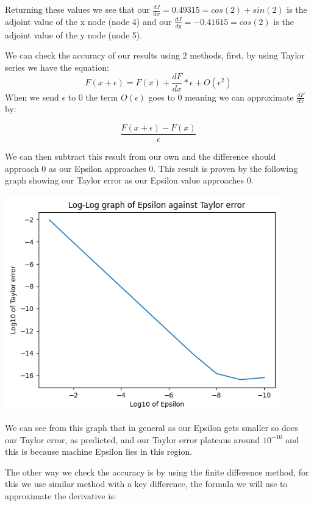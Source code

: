 \documentclass{article}
\begin{document}
Returning these values we see that our $\frac{dJ}{dx} = 0.49315 = cos(2) + sin(2)$ is the adjoint value of the x node (node 4) and our $\frac{dJ}{dy} = -0.41615 = cos(2)$ is the adjoint value of the y node (node 5).

We can check the accuracy of our results using 2 methods, first, by using Taylor series we have the equation:
\begin{equation}
    F(x + \epsilon) = F(x) + \frac{dF}{dx} * \epsilon + O(\epsilon ^ 2)
\end{equation}
When we send $\epsilon$ to 0 the term $O(\epsilon)$ goes to 0 meaning we can approximate $\frac{dF}{dx}$ by:

\begin{equation}
    \frac{F(x + \epsilon) - F(x)}{\epsilon}
\end{equation}

We can then subtract this result from our own and the difference should approach 0 as our Epsilon approaches 0. This result is proven by the following graph showing our Taylor error as our Epsilon value approaches 0.

\begin{center}
    \includegraphics[width=12cm]{images/Taylor_error_1.png}
\end{center}

We can see from this graph that in general as our Epsilon gets smaller so does our Taylor error, as predicted, and our Taylor error plateaus around $10^{-16}$ and this is because machine Epsilon lies in this region.

The other way we check the accuracy is by using the finite difference method, for this we use similar method with a key difference, the formula we will use to approximate the derivative is:
\end{document}
